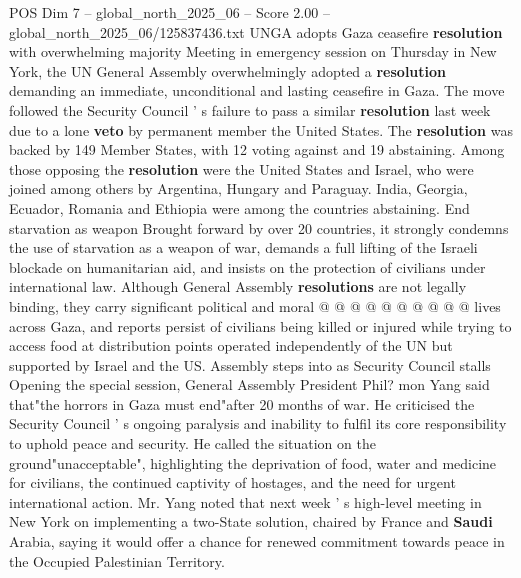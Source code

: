 \begin{textsample}{POS Dim 7 – global\_north\_2025\_06 – Score 2.00 – global\_north\_2025\_06/125837436.txt}  \label{ex:f7_pos_376}
UNGA adopts Gaza ceasefire \textbf{resolution} with overwhelming majority Meeting in emergency session on Thursday in New York, the UN General Assembly overwhelmingly adopted a \textbf{resolution} demanding an immediate, unconditional and lasting ceasefire in Gaza.
The move followed the Security Council ' s failure to pass a similar \textbf{resolution} last week due to a lone \textbf{veto} by permanent member the United States.
The \textbf{resolution} was backed by 149 Member States, with 12 voting against and 19 abstaining.
Among those opposing the \textbf{resolution} were the United States and Israel, who were joined among others by Argentina, Hungary and Paraguay.
India, Georgia, Ecuador, Romania and Ethiopia were among the countries abstaining.
End starvation as weapon Brought forward by over 20 countries, it strongly condemns the use of starvation as a weapon of war, demands a full lifting of the Israeli blockade on humanitarian aid, and insists on the protection of civilians under international law.
Although General Assembly \textbf{resolutions} are not legally binding, they carry significant political and moral @ @ @ @ @ @ @ @ @ @ lives across Gaza, and reports persist of civilians being killed or injured while trying to access food at distribution points operated independently of the UN but supported by Israel and the US.
Assembly steps into as Security Council stalls Opening the special session, General Assembly President Phil? mon Yang said that"the horrors in Gaza must end"after 20 months of war.
He criticised the Security Council ' s ongoing paralysis and inability to fulfil its core responsibility to uphold peace and security.
He called the situation on the ground"unacceptable", highlighting the deprivation of food, water and medicine for civilians, the continued captivity of hostages, and the need for urgent international action.
Mr.
Yang noted that next week ' s high-level meeting in New York on implementing a two-State solution, chaired by France and \textbf{Saudi} Arabia, saying it would offer a chance for renewed commitment towards peace in the Occupied Palestinian Territory.

\end{textsample}
